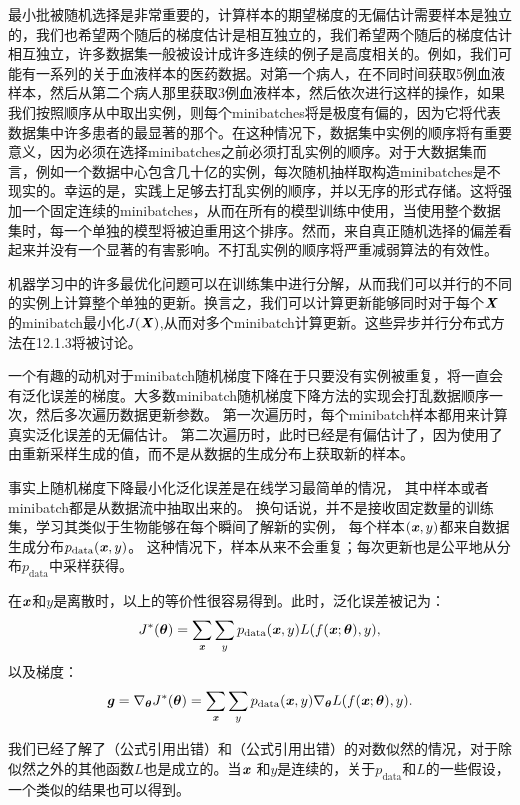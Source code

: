 最小批被随机选择是非常重要的，计算样本的期望梯度的无偏估计需要样本是独立的，我们也希望两个随后的梯度估计是相互独立的，我们希望两个随后的梯度估计相互独立，许多数据集一般被设计成许多连续的例子是高度相关的。例如，我们可能有一系列的关于血液样本的医药数据。对第一个病人，在不同时间获取5例血液样本，然后从第二个病人那里获取3例血液样本，然后依次进行这样的操作，如果我们按照顺序从中取出实例，则每个minibatches将是极度有偏的，因为它将代表数据集中许多患者的最显著的那个。在这种情况下，数据集中实例的顺序将有重要意义，因为必须在选择minibatches之前必须打乱实例的顺序。对于大数据集而言，例如一个数据中心包含几十亿的实例，每次随机抽样取构造minibatches是不现实的。幸运的是，实践上足够去打乱实例的顺序，并以无序的形式存储。这将强加一个固定连续的minibatches，从而在所有的模型训练中使用，当使用整个数据集时，每一个单独的模型将被迫重用这个排序。然而，来自真正随机选择的偏差看起来并没有一个显著的有害影响。不打乱实例的顺序将严重减弱算法的有效性。

机器学习中的许多最优化问题可以在训练集中进行分解，从而我们可以并行的不同的实例上计算整个单独的更新。换言之，我们可以计算更新能够同时对于每个$\boldsymbol{\mathit{X}}$的minibatch最小化$J(\boldsymbol{\mathit{X}})$,从而对多个minibatch计算更新。这些异步并行分布式方法在12.1.3将被讨论。

一个有趣的动机对于minibatch随机梯度下降在于只要没有实例被重复，将一直会有泛化误差的梯度。大多数minibatch随机梯度下降方法的实现会打乱数据顺序一次，然后多次遍历数据更新参数。
第一次遍历时，每个minibatch样本都用来计算真实泛化误差的无偏估计。
第二次遍历时，此时已经是有偏估计了，因为使用了由重新采样生成的值，而不是从数据的生成分布上获取新的样本。

事实上随机梯度下降最小化泛化误差是在线学习最简单的情况，
其中样本或者minibatch都是从数据流中抽取出来的。
换句话说，并不是接收固定数量的训练集，学习其类似于生物能够在每个瞬间了解新的实例，
每个样本$(\boldsymbol{\mathit{x}},y)$都来自数据生成分布$p_{\text{data}}(\boldsymbol{\mathit{x}},y)$。
这种情况下，样本从来不会重复；每次更新也是公平地从分布$p_\text{data}$中采样获得。

在$\boldsymbol{\mathit{x}}$和$y$是离散时，以上的等价性很容易得到。此时，泛化误差被记为：
\begin{equation}
\label{eq:8.7}
    J^*(\boldsymbol{\theta}) = \sum_{\boldsymbol{\mathit{x}}} \sum_y p_{\text{data}}(\boldsymbol{\mathit{x}}, y) L(f(\boldsymbol{\mathit{x}}; \boldsymbol{\theta}),y),
\end{equation}
以及梯度：
\begin{equation}
\label{eq:8.8}
    \boldsymbol{\mathit{g}} = \nabla_{\boldsymbol{\theta}} J^*(\boldsymbol{\theta}) = \sum_{\boldsymbol{\mathit{x}}} \sum_y p_{\text{data}}
    (\boldsymbol{\mathit{x}}, y) \nabla_{\boldsymbol{\theta}} L(f(\boldsymbol{\mathit{x}};\boldsymbol{\theta}),y) .
\end{equation}

我们已经了解了（公式引用出错）和（公式引用出错）的对数似然的情况，对于除似然之外的其他函数$L$也是成立的。当$\boldsymbol{\mathit{x}}$ 和$y$是连续的，关于$p_\text{data}$和$L$的一些假设，一个类似的结果也可以得到。

